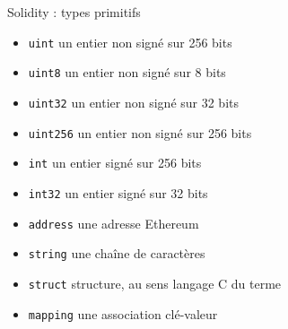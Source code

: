 \begin{frame}{Solidity : types primitifs}
  \begin{itemize}
    \item \texttt{uint} un entier non signé sur 256 bits
    \item \texttt{uint8} un entier non signé sur 8 bits
    \item \texttt{uint32} un entier non signé sur 32 bits
    \item \texttt{uint256} un entier non signé sur 256 bits
    \item \texttt{int} un entier signé sur 256 bits
    \item \texttt{int32} un entier signé sur 32 bits
    \item \texttt{address} une adresse Ethereum
    \item \texttt{string} une chaîne de caractères
    \item \texttt{struct} structure, au sens langage C du terme
    \item \texttt{mapping} une association clé-valeur
  \end{itemize}
\end{frame}


